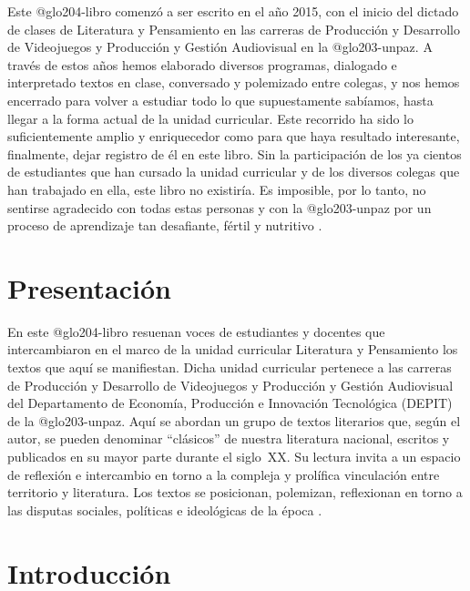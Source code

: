 Este \gls{@glo204-libro} comenzó a ser escrito en el año 2015, con el inicio del dictado de clases de Literatura y Pensamiento en las carreras de Producción y Desarrollo de Videojuegos y Producción y Gestión Audiovisual en la \gls{@glo203-unpaz}. A través de estos años hemos elaborado diversos programas, dia\-logado e interpretado textos en clase, conversado y polemizado entre colegas, y nos hemos encerrado para volver a estudiar todo lo que supuestamente sabíamos, hasta llegar a la forma actual de la unidad curricular. Este recorrido ha sido lo suficientemente amplio y enriquecedor como para que haya resultado interesante, finalmente, dejar registro de él en este libro. Sin la participación de los ya cientos de estudiantes que han cursado la unidad curricular y de los diversos colegas que han trabajado en ella, este libro no exis\-tiría. Es imposible, por lo tanto, no sentirse agradecido con todas estas personas y con la \gls{@glo203-unpaz} por un proceso de aprendizaje tan desafiante, fértil y nutritivo \parencite{@3187-WELLS2014}.

\chapter{Presentación}
\ifPDF
{}
	\else
	\ifBLACKPDF
	\fi
\fi

En este \gls{@glo204-libro} resuenan voces de estudiantes y docentes que intercambiaron en el marco de la unidad curricular Literatura y Pensamiento los textos que aquí se manifiestan. Dicha unidad curricular pertenece a las carreras de Producción y Desarrollo de Videojuegos y Producción y Gestión Audiovisual del Departamento de Economía, Producción e Innovación Tecnológica (DEPIT) de la \gls{@glo203-unpaz}. Aquí se abordan un grupo de textos literarios que, según el autor, se pueden denominar \enquote{clásicos} de nuestra literatura nacional, escritos y publicados en su mayor parte durante el siglo~XX. Su lectura invita a un espacio de reflexión e intercambio en torno a la compleja y prolífica vinculación entre territorio y literatura. Los textos se posicionan, polemizan, reflexionan en torno a las disputas sociales, políticas e ideológicas de la época \parencite{@3187-WELLS2014}.

\chapter{Introducción}
\ifPDF
{}
	\else
	\ifBLACKPDF
	\fi
\fi

